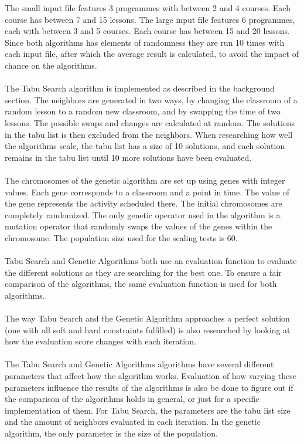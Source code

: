 \documentclass[titlepage,a4paper]{article}
\begin{document}
The small input file features 3 programmes with between 2 and 4 courses. Each course has between 7 and 15 lessons.
The large input file features 6 programmes, each with between 3 and 5 courses. Each course has between 15 and 20 lessons.
Since both algorithms has elements of randomness they are run 10 times with each input file, after which the average result is calculated, to avoid the impact of chance on the algorithms. \\\\
The Tabu Search algorithm is implemented as described in the background section. The neighbors are generated in two ways, by changing the classroom of a random lesson to a random new classroom, and by swapping the time of two lessons. The possible swaps and changes are calculated at random. The solutions in the tabu list is then excluded from the neighbors. When researching how well the algorithms scale, the tabu list has a size of 10 solutions, and each solution remains in the tabu list until 10 more solutions have been evaluated. \\\\
The chromosomes of the genetic algorithm are set up using genes with integer values. Each gene corresponds to a classroom and a point in time. The value of the gene represents the activity scheduled there. The initial chromosomes are completely randomized. The only genetic operator used in the algorithm is a mutation operator that randomly swaps the values of the genes within the chromosome. The population size used for the scaling tests is 60. \\\\
Tabu Search and Genetic Algorithms both use an evaluation function to evaluate the different solutions as they are searching for the best one. To ensure a fair comparison of the algorithms, the same evaluation function is used for both algorithms. \\\\
The way Tabu Search and the Genetic Algorithm approaches a perfect solution (one with all soft and hard constraints fulfilled) is also researched by looking at how the evaluation score changes with each iteration. \\\\
The Tabu Search and Genetic Algorithms algorithms have several different parameters that affect how the algorithm works. Evaluation of how varying these parameters influence the results of the algorithms is also be done to figure out if the comparison of the algorithms holds in general, or just for a specific implementation of them.
For Tabu Search, the parameters are the tabu list size and the amount of neighbors evaluated in each iteration. 
In the genetic algorithm, the only parameter is the size of the population.
\end{document}
